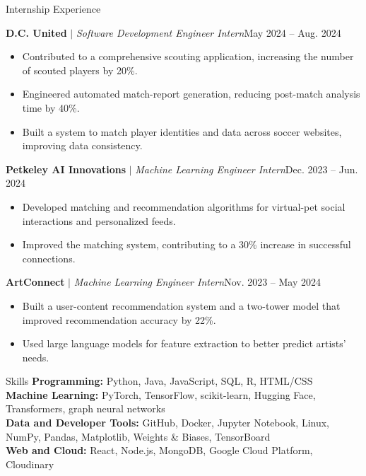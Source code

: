 \documentclass{resume}
\begin{document}
\begin{rSection}{Internship Experience}
\vspace{-1.25em}
\item \textbf{D.C. United} $|$ \textit{Software Development Engineer Intern}\hfill May 2024 -- Aug. 2024
\begin{itemize}[leftmargin=0.15in]
\itemsep -6pt
\item Contributed to a comprehensive scouting application, increasing the number of scouted players by 20\%.
\item Engineered automated match-report generation, reducing post-match analysis time by 40\%.
\item Built a system to match player identities and data across soccer websites, improving data consistency.
\end{itemize}
\item \textbf{Petkeley AI Innovations} $|$ \textit{Machine Learning Engineer Intern}\hfill Dec. 2023 -- Jun. 2024
\begin{itemize}[leftmargin=0.15in]
\itemsep -6pt
\item Developed matching and recommendation algorithms for virtual-pet social interactions and personalized feeds.
\item Improved the matching system, contributing to a 30\% increase in successful connections.
\end{itemize}
\item \textbf{ArtConnect} $|$ \textit{Machine Learning Engineer Intern}\hfill Nov. 2023 -- May 2024
\begin{itemize}[leftmargin=0.15in]
\itemsep -6pt
\item Built a user-content recommendation system and a two-tower model that improved recommendation accuracy by 22\%.
\item Used large language models for feature extraction to better predict artists' needs.
\end{itemize}
\end{rSection}

\begin{rSection}{Skills}
\textbf{Programming:} Python, Java, JavaScript, SQL, R, HTML/CSS\\
\textbf{Machine Learning:} PyTorch, TensorFlow, scikit-learn, Hugging Face, Transformers, graph neural networks\\
\textbf{Data and Developer Tools:} GitHub, Docker, Jupyter Notebook, Linux, NumPy, Pandas, Matplotlib, Weights \& Biases, TensorBoard\\
\textbf{Web and Cloud:} React, Node.js, MongoDB, Google Cloud Platform, Cloudinary
\end{rSection}
\end{document}
